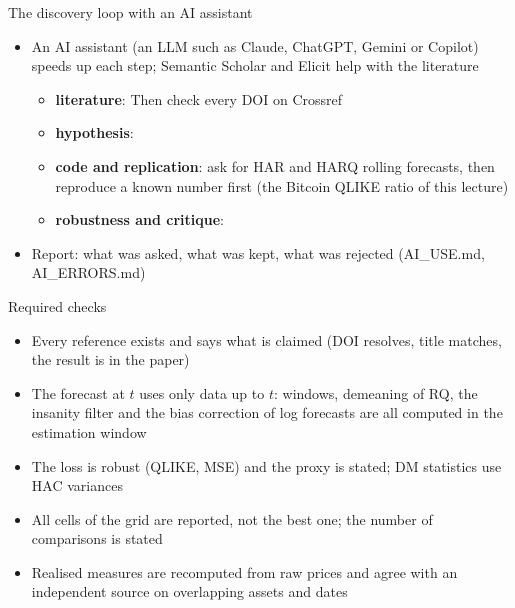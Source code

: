 \begin{frame}{The discovery loop with an AI assistant}
\itemsize{\footnotesize}
\begin{itemize}
    \item An AI assistant (an LLM such as Claude, ChatGPT, Gemini or Copilot) speeds up each step; Semantic Scholar and Elicit help with the literature
    \begin{itemize}
        \item \textbf{literature}:  Then check every DOI on Crossref
        \item \textbf{hypothesis}: 
        \item \textbf{code and replication}: ask for HAR and HARQ rolling forecasts, then reproduce a known number first (the Bitcoin QLIKE ratio of this lecture)
        \item \textbf{robustness and critique}: 
    \end{itemize}
    \item Report: what was asked, what was kept, what was rejected (AI\_USE.md, AI\_ERRORS.md)
\end{itemize}
\end{frame}

\begin{frame}{Required checks}
\itemsize{\small}
\begin{itemize}
    \item Every reference exists and says what is claimed (DOI resolves, title matches, the result is in the paper)
    \item The forecast at $t$ uses only data up to $t$: windows, demeaning of RQ, the insanity filter and the bias correction of log forecasts are all computed in the estimation window
    \item The loss is robust (QLIKE, MSE) and the proxy is stated; DM statistics use HAC variances
    \item All cells of the grid are reported, not the best one; the number of comparisons is stated
    \item Realised measures are recomputed from raw prices and agree with an independent source on overlapping assets and dates
\end{itemize}
\end{frame}

